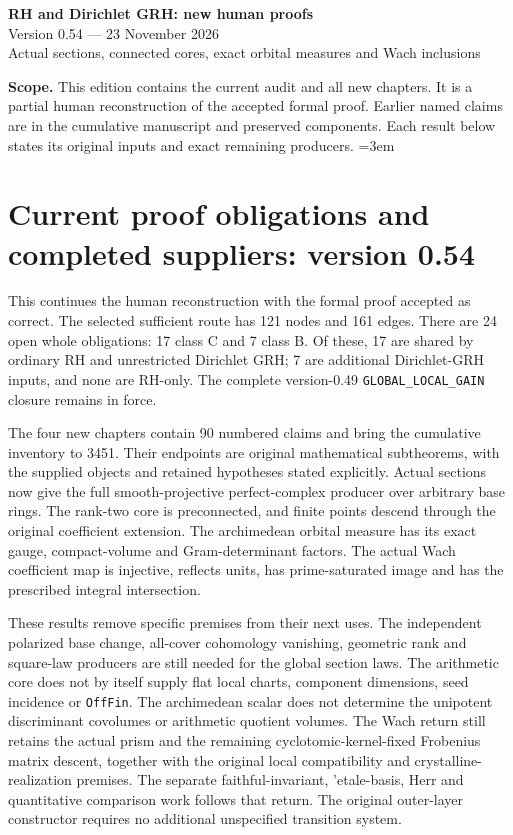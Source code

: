 \documentclass[11pt,a4paper]{article}
\numberwithin{equation}{section}
\theoremstyle{remark}\newtheorem{remark}[theorem]{Remark}
\begin{document}
\begin{center}
{\LARGE\bfseries RH and Dirichlet GRH: new human proofs}\\[7pt]
{\large Version 0.54 --- 23 November 2026}\\[5pt]
{\large Actual sections, connected cores, exact orbital measures and Wach inclusions}
\end{center}
\textbf{Scope.} This edition contains the current audit and all new chapters.
It is a partial human reconstruction of the accepted formal proof.
Earlier named claims are in the cumulative manuscript and preserved components.
Each result below states its original inputs and exact remaining producers.
\setcounter{tocdepth}{1}
\tableofcontents
\clearpage
\begingroup\emergencystretch=3em
\section{Current proof obligations and completed suppliers: version 0.54}
\label{sec:dependency-audit-v54}

This continues the human reconstruction with the formal proof accepted
as correct. The selected sufficient route has 121 nodes and 161 edges.
There are 24 open whole obligations: 17 class C and 7 class B.
Of these, 17 are shared by ordinary RH and unrestricted Dirichlet
GRH; 7 are additional Dirichlet-GRH inputs, and none are RH-only.
The complete version-0.49 \texttt{GLOBAL\_\allowbreak LOCAL\_\allowbreak GAIN} closure remains
in force.

The four new chapters contain 90 numbered claims and bring the
cumulative inventory to 3451. Their endpoints are original
mathematical subtheorems, with the supplied objects and retained
hypotheses stated explicitly. Actual sections now give the full
smooth-projective perfect-complex producer over arbitrary base rings.
The rank-two core is preconnected, and finite points descend through
the original coefficient extension. The archimedean orbital measure
has its exact gauge, compact-volume and Gram-determinant factors.
The actual Wach coefficient map is injective, reflects units, has
prime-saturated image and has the prescribed integral intersection.

These results remove specific premises from their next uses. The
independent polarized base change, all-cover cohomology vanishing,
geometric rank and square-law producers are still needed for the
global section laws. The arithmetic core does not by itself supply
flat local charts, component dimensions, seed incidence or
\texttt{Off\allowbreak Fin}. The archimedean scalar does not determine the
unipotent discriminant covolumes or arithmetic quotient volumes.
The Wach return still retains the actual prism and the remaining
cyclotomic-kernel-fixed Frobenius matrix descent, together with the
original local compatibility and crystalline-realization premises.
The separate faithful-invariant, 'etale-basis, Herr and quantitative
comparison work follows that return. The original outer-layer
constructor requires no additional unspecified transition system.
\end{document}
